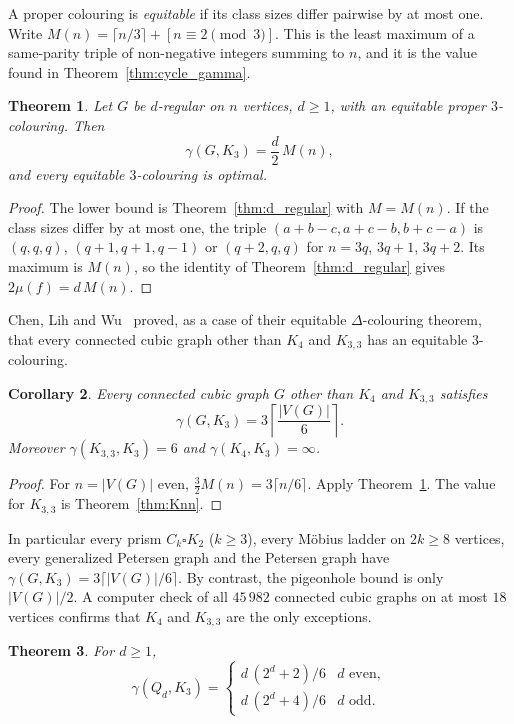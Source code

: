\documentclass{article}
\newtheorem{theorem}{Theorem}[section]
\newtheorem{corollary}[theorem]{Corollary}
\theoremstyle{definition}
\begin{document}
A proper colouring is \emph{equitable} if its class sizes differ pairwise by at
most one.  Write $M(n)=\lceil n/3\rceil+[n\equiv2\pmod 3]$.  This is the least
maximum of a same-parity triple of non-negative integers summing to $n$, and it is
the value found in Theorem~\ref{thm:cycle_gamma}.

\begin{theorem}
\label{thm:equitable}
Let $G$ be $d$-regular on $n$ vertices, $d\ge1$, with an equitable proper
$3$-colouring.  Then
\[
  \gamma(G,K_3)=\frac d2\,M(n),
\]
and every equitable $3$-colouring is optimal.
\end{theorem}

\begin{proof}
The lower bound is Theorem~\ref{thm:d_regular} with $M=M(n)$.  If the class sizes
differ by at most one, the triple $(a+b-c,a+c-b,b+c-a)$ is $(q,q,q)$,
$(q+1,q+1,q-1)$ or $(q+2,q,q)$ for $n=3q$, $3q+1$, $3q+2$.  Its maximum is
$M(n)$, so the identity of Theorem~\ref{thm:d_regular} gives
$2\mu(f)=d\,M(n)$.
\end{proof}

Chen, Lih and Wu~\cite{chenlihwu1994} proved, as a case of their equitable
$\Delta$-colouring theorem, that every connected cubic graph other than $K_4$ and
$K_{3,3}$ has an equitable $3$-colouring.

\begin{corollary}
\label{cor:cubic}
Every connected cubic graph $G$ other than $K_4$ and $K_{3,3}$ satisfies
\[
  \gamma(G,K_3)=3\left\lceil\frac{|V(G)|}{6}\right\rceil .
\]
Moreover $\gamma(K_{3,3},K_3)=6$ and $\gamma(K_4,K_3)=\infty$.
\end{corollary}

\begin{proof}
For $n=|V(G)|$ even, $\frac32M(n)=3\lceil n/6\rceil$.  Apply
Theorem~\ref{thm:equitable}.  The value for $K_{3,3}$ is Theorem~\ref{thm:Knn}.
\end{proof}

In particular every prism $C_k\square K_2$ ($k\ge3$), every M\"obius ladder on
$2k\ge8$ vertices, every generalized Petersen graph and the Petersen graph have
$\gamma(G,K_3)=3\lceil|V(G)|/6\rceil$.  By contrast, the pigeonhole bound is only
$|V(G)|/2$.  A computer check of all $45\,982$ connected cubic graphs on at most
$18$ vertices confirms that $K_4$ and $K_{3,3}$ are the only exceptions.

\begin{theorem}
\label{thm:cube}
For $d\ge1$,
\[
  \gamma(Q_d,K_3)=\begin{cases} d\,(2^d+2)/6 & d \text{ even},\\
  d\,(2^d+4)/6 & d\text{ odd}.\end{cases}
\]
\end{theorem}
\end{document}
